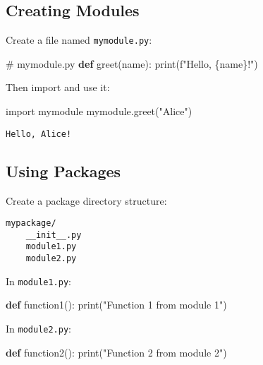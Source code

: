 \documentclass[
  letterpaper,
  DIV=11,
  numbers=noendperiod]{scrreprt}
\newenvironment{Shaded}{\begin{snugshade}}{\end{snugshade}}
\newcommand{\BuiltInTok}[1]{\textcolor[rgb]{0.00,0.23,0.31}{#1}}
\newcommand{\CommentTok}[1]{\textcolor[rgb]{0.37,0.37,0.37}{#1}}
\newcommand{\ImportTok}[1]{\textcolor[rgb]{0.00,0.46,0.62}{#1}}
\newcommand{\KeywordTok}[1]{\textcolor[rgb]{0.00,0.23,0.31}{\textbf{#1}}}
\newcommand{\NormalTok}[1]{\textcolor[rgb]{0.00,0.23,0.31}{#1}}
\newcommand{\SpecialCharTok}[1]{\textcolor[rgb]{0.37,0.37,0.37}{#1}}
\newcommand{\SpecialStringTok}[1]{\textcolor[rgb]{0.13,0.47,0.30}{#1}}
\newcommand{\StringTok}[1]{\textcolor[rgb]{0.13,0.47,0.30}{#1}}
\begin{document}
\subsection{Creating Modules}\label{creating-modules}

Create a file named \texttt{mymodule.py}:

\begin{Shaded}
\begin{Highlighting}[]
\CommentTok{\# mymodule.py}
\KeywordTok{def}\NormalTok{ greet(name):}
    \BuiltInTok{print}\NormalTok{(}\SpecialStringTok{f"Hello, }\SpecialCharTok{\{}\NormalTok{name}\SpecialCharTok{\}}\SpecialStringTok{!"}\NormalTok{)}
\end{Highlighting}
\end{Shaded}

Then import and use it:

\begin{Shaded}
\begin{Highlighting}[]
\ImportTok{import}\NormalTok{ mymodule}
\NormalTok{mymodule.greet(}\StringTok{"Alice"}\NormalTok{)}
\end{Highlighting}
\end{Shaded}

\begin{verbatim}
Hello, Alice!
\end{verbatim}

\subsection{Using Packages}\label{using-packages}

Create a package directory structure:

\begin{verbatim}
mypackage/
    __init__.py
    module1.py
    module2.py
\end{verbatim}

In \texttt{module1.py}:

\begin{Shaded}
\begin{Highlighting}[]
\KeywordTok{def}\NormalTok{ function1():}
    \BuiltInTok{print}\NormalTok{(}\StringTok{"Function 1 from module 1"}\NormalTok{)}
\end{Highlighting}
\end{Shaded}

In \texttt{module2.py}:

\begin{Shaded}
\begin{Highlighting}[]
\KeywordTok{def}\NormalTok{ function2():}
    \BuiltInTok{print}\NormalTok{(}\StringTok{"Function 2 from module 2"}\NormalTok{)}
\end{Highlighting}
\end{Shaded}
\end{document}
